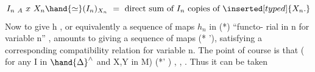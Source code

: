 \[ I_{n\ A} \ x \ X_n \hand{\simeq} (I_n)_{X_n} \ = \ \text{direct sum of } I_n \text{ copies of } \inserted[typed]{X_n.} \]
Now to give  h ,  or equivalently a sequence of maps $h_n$ in (*)  ``functo-%
rial in n for variable n'' ,  amounts to giving a sequence of maps (* '),
satisfying a corresponding compatibility relation  for variable n.  The
point of course is that  ( for any I in $\hand{\Delta}^{\wedge}$ and  X,Y  in M)  \hand{\uline{\textcolor{black}{the set of}}}
\hand{\uline{\textcolor{black}{data}}} (*' )  \hand{\uline{\textcolor{black}{plus the compatibility condition make}}} \hand{\uline{\textcolor{black}{a sense}}},  \hand{\uline{\textcolor{black}{formally}}},
\hand{\uline{\textcolor{black}{independently of}}}  \hand{\uline{\textcolor{black}{any exactness assumptions on A}}}.  Thus it can be taken

